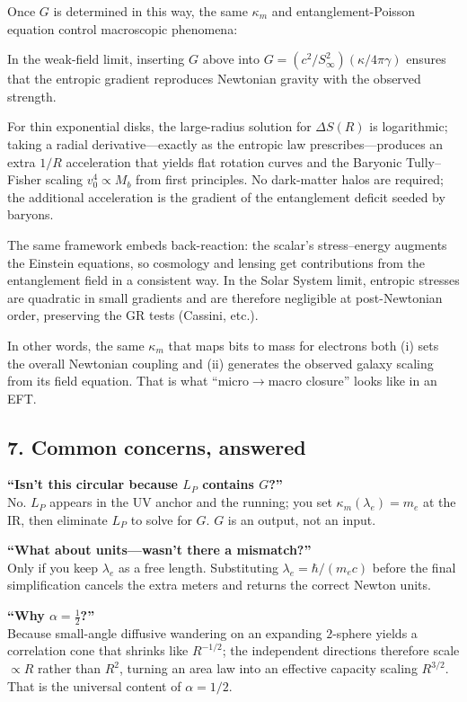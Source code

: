 \documentclass[11pt]{article}
\begin{document}
Once $G$ is determined in this way, the same $\kappa_m$ and entanglement-Poisson equation control macroscopic phenomena:

In the weak-field limit, inserting $G$ above into $G=(c^2/S_\infty^2)(\kappa/4\pi\gamma)$ ensures that the entropic gradient reproduces Newtonian gravity with the observed strength.

For thin exponential disks, the large-radius solution for $\Delta S(R)$ is logarithmic; taking a radial derivative—exactly as the entropic law prescribes—produces an extra $1/R$ acceleration that yields flat rotation curves and the Baryonic Tully–Fisher scaling $v_0^4\propto M_b$ from first principles. No dark-matter halos are required; the additional acceleration is the gradient of the entanglement deficit seeded by baryons.

The same framework embeds back-reaction: the scalar’s stress–energy augments the Einstein equations, so cosmology and lensing get contributions from the entanglement field in a consistent way. In the Solar System limit, entropic stresses are quadratic in small gradients and are therefore negligible at post-Newtonian order, preserving the GR tests (Cassini, etc.).

In other words, the same $\kappa_m$ that maps bits to mass for electrons both (i) sets the overall Newtonian coupling and (ii) generates the observed galaxy scaling from its field equation. That is what “micro$\to$macro closure” looks like in an EFT.

\subsection*{7. Common concerns, answered}

\textbf{“Isn’t this circular because $L_P$ contains $G$?”}\\
No. $L_P$ appears in the UV anchor and the running; you set $\kappa_m(\lambda_e)=m_e$ at the IR, then eliminate $L_P$ to solve for $G$. $G$ is an output, not an input.

\textbf{“What about units—wasn’t there a mismatch?”}\\
Only if you keep $\lambda_e$ as a free length. Substituting $\lambda_e=\hbar/(m_e c)$ before the final simplification cancels the extra meters and returns the correct Newton units.

\textbf{“Why $\alpha=\tfrac12$?”}\\
Because small-angle diffusive wandering on an expanding $2$-sphere yields a correlation cone that shrinks like $R^{-1/2}$; the independent directions therefore scale $\propto R$ rather than $R^2$, turning an area law into an effective capacity scaling $R^{3/2}$. That is the universal content of $\alpha=1/2$.
\end{document}
